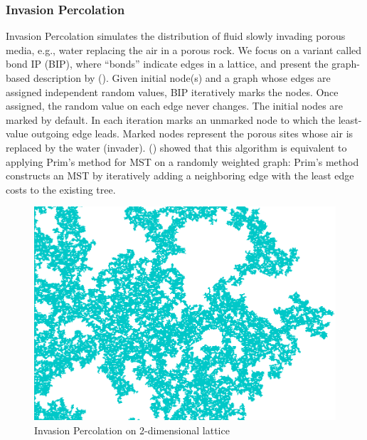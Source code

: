 \subsubsection{Invasion Percolation}

Invasion Percolation \cite{wilkinson1983invasion} simulates the distribution of fluid slowly %
invading porous media, e.g., water replacing the air in a porous rock.
We focus on a variant called bond IP (BIP), where ``bonds'' indicate edges in a lattice, and present the graph-based description by \citeauthor{barabasi1996invasion} (\citeyear{barabasi1996invasion}).
Given initial node(s) and a graph whose edges are assigned independent random values,
BIP iteratively marks the nodes.
Once assigned, the random value on each edge never changes.  The initial nodes are marked by default.
In each iteration marks an unmarked node to which the least-value outgoing edge leads.
Marked nodes represent the porous sites whose air is replaced by the water (invader).
\citeauthor{barabasi1996invasion} (\citeyear{barabasi1996invasion}) showed that
this algorithm is equivalent to applying Prim's method for MST \cite{prim1957shortest} on a randomly weighted graph:
Prim's method constructs an MST by iteratively adding a neighboring edge with the least edge costs
to the existing tree.


\begin{figure}[tb]
 \centering
 \includegraphics[width=0.4\linewidth]{img/static/ip.png}
 \caption{Invasion Percolation on 2-dimensional lattice}
 \label{fig:ip}
\end{figure}

